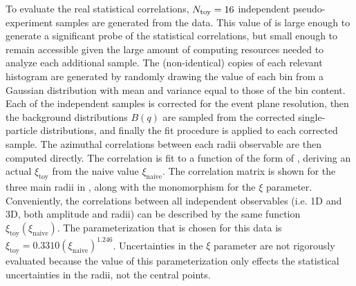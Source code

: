 To evaluate the real statistical correlations, $N_\textrm{toy} = 16$ independent pseudo-experiment samples are generated from the data.
This value of \Ntoy is large enough to generate a significant probe of the statistical correlations, but small enough to remain accessible given the large amount of computing resources needed to analyze each additional sample.
The \Ntoy (non-identical) copies of each relevant histogram are generated by randomly drawing the value of each bin from a Gaussian distribution with mean and variance equal to those of the bin content.
Each of the independent \Ntoy samples is corrected for the event plane resolution, then the background distributions $B(q)$ are sampled from the corrected single-particle distributions, and finally the fit procedure is applied to each corrected sample.
The azimuthal correlations between each radii observable are then computed directly.
The correlation is fit to a function of the form of \Eqn{\ref{eq:corr_coeff_matrix}}, deriving an actual $\xi_\textrm{toy}$ from the naive value $\xi_\textrm{naive}$.
The correlation matrix is shown for the three main radii in \Fig{\ref{fig:rho_dphi}}, along with the monomorphism for the $\xi$ parameter.
Conveniently, the correlations between all independent observables (i.e. 1D and 3D, both amplitude and radii) can be described by the same function $\xi_\textrm{toy}\left(\xi_\textrm{naive}\right)$.
The parameterization that is chosen for this data is $ \xi_\textrm{toy} = 0.3310 (\xi_\textrm{naive})^{1.246} $.
Uncertainties in the $\xi$ parameter are not rigorously evaluated because the value of this parameterization only effects the statistical uncertainties in the radii, not the central points.

